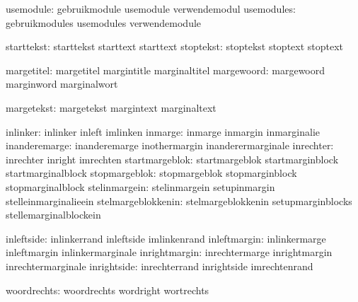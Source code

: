                     usemodule:  gebruikmodule                usemodule
                                verwendemodul
                   usemodules:  gebruikmodules               usemodules
                                verwendemodule

                   starttekst:  starttekst                   starttext
                                starttext
                    stoptekst:  stoptekst                    stoptext
                                stoptext

                   margetitel:  margetitel                   margintitle
                                marginaltitel
                   margewoord:  margewoord                   marginword
                                marginalwort


                   margetekst:  margetekst                   margintext
                                marginaltext

                     inlinker:  inlinker                     inleft
                                imlinken
                      inmarge:  inmarge                      inmargin
                                inmarginalie
                inanderemarge:  inanderemarge                inothermargin
                                inanderermarginale
                    inrechter:  inrechter                    inright
                                imrechten
               startmargeblok:  startmargeblok               startmarginblock
                                startmarginalblock
                stopmargeblok:  stopmargeblok                stopmarginblock
                                stopmarginalblock
                stelinmargein:  stelinmargein                setupinmargin
                                stelleinmarginalieein
           stelmargeblokkenin:  stelmargeblokkenin           setupmarginblocks
                                stellemarginalblockein

                   inleftside:  inlinkerrand                 inleftside
                                imlinkenrand
                 inleftmargin:  inlinkermarge                inleftmargin
                                inlinkermarginale
                inrightmargin:  inrechtermarge               inrightmargin
                                inrechtermarginale
                  inrightside:  inrechterrand                inrightside
                                imrechtenrand

                  woordrechts:  woordrechts                  wordright
                                wortrechts


